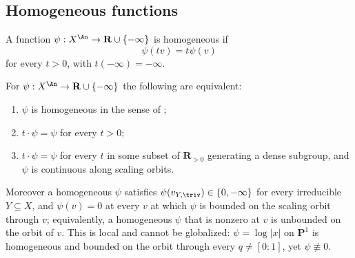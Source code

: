 \subsection{Homogeneous functions}
\label{sec:ch35-homogeneous-functions}

\begin{definition}
\label{def:homogeneous-function}
A function $\psi:X^{\An}\to\mathbf R\cup\{-\infty\}$ is homogeneous if
\begin{equation}
\label{eq:homogeneous-function}
                         \psi(tv)=t\psi(v)
\end{equation}
for every $t>0$, with $t(-\infty)=-\infty$.
\end{definition}

\begin{lemma}
\label{lem:ch35-homogeneity-reformulations}
For $\psi:X^{\An}\to\mathbf R\cup\{-\infty\}$ the following are
equivalent:
\begin{enumerate}
\item $\psi$ is homogeneous in the sense of
 ;
\item $t\cdot\psi=\psi$ for every $t>0$;
\item $t\cdot\psi=\psi$ for every $t$ in some subset of
 $\mathbf R_{>0}$ generating a dense subgroup, and $\psi$ is continuous
 along scaling orbits.
\end{enumerate}
Moreover a homogeneous $\psi$ satisfies
$\psi(v_{Y,\triv})\in\{0,-\infty\}$ for every irreducible
$Y\subseteq X$, and $\psi(v)=0$ at every $v$ at which $\psi$ is bounded on the
scaling orbit through $v$; equivalently, a homogeneous $\psi$ that is
nonzero at $v$ is unbounded on the orbit of $v$.  This is local and
cannot be globalized: $\psi=\log|x|$ on $\mathbf P^1$ is homogeneous and
bounded on the orbit through every $q\neq[0:1]$, yet $\psi\not\equiv0$.
\end{lemma}

